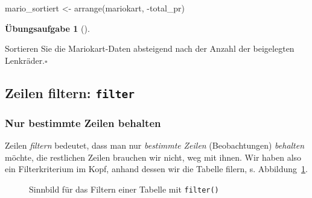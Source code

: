 \documentclass[
  letterpaper,
]{scrbook}
\newenvironment{Shaded}{\begin{snugshade}}{\end{snugshade}}
\newcommand{\FunctionTok}[1]{\textcolor[rgb]{0.28,0.35,0.67}{#1}}
\newcommand{\NormalTok}[1]{\textcolor[rgb]{0.00,0.23,0.31}{#1}}
\newcommand{\OtherTok}[1]{\textcolor[rgb]{0.00,0.23,0.31}{#1}}
\newcommand{\SpecialCharTok}[1]{\textcolor[rgb]{0.37,0.37,0.37}{#1}}
\theoremstyle{definition}
\theoremstyle{definition}
\theoremstyle{definition}
\newtheorem{exercise}{Übungsaufgabe}[chapter]
\theoremstyle{remark}
\begin{document}
\begin{Shaded}
\begin{Highlighting}[]
\NormalTok{mario\_sortiert }\OtherTok{\textless{}{-}} \FunctionTok{arrange}\NormalTok{(mariokart, }\SpecialCharTok{{-}}\NormalTok{total\_pr)}
\end{Highlighting}
\end{Shaded}

\begin{exercise}[]\protect\hypertarget{exr-arrange2}{}\label{exr-arrange2}

Sortieren Sie die Mariokart-Daten absteigend nach der Anzahl der
beigelegten Lenkräder.\(\square\)

\end{exercise}

\subsection{\texorpdfstring{Zeilen filtern:
\texttt{filter}}{Zeilen filtern: filter}}\label{zeilen-filtern-filter}

\subsubsection{Nur bestimmte Zeilen
behalten}\label{nur-bestimmte-zeilen-behalten}

Zeilen \emph{filtern} bedeutet, dass man nur \emph{bestimmte}
\emph{Zeilen} (Beobachtungen) \emph{behalten} möchte, die restlichen
Zeilen brauchen wir nicht, weg mit ihnen. Wir haben also ein
Filterkriterium im Kopf, anhand dessen wir die Tabelle filern, s.
Abbildung~\ref{fig-filter}.

\begin{figure}


\caption{\label{fig-filter}Sinnbild für das Filtern einer Tabelle mit
\texttt{filter()}}

\end{figure}%
\end{document}
